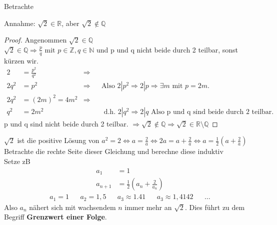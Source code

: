 \documentclass[a4paper,titlepage,oneside]{article}
\def\N{\ensuremath{\mathbb{N}} }
\def\Q{\ensuremath{\mathbb{Q}} }
\def\Z{\ensuremath{\mathbb{Z}} }
\def\R{\ensuremath{\mathbb{R}} }
\def\WSP{\text{Widerspruch! }}
\theoremstyle{thmstyle}
\begin{document}
\begin{subbsp}
Betrachte
\begin{center}  \end{center}
Annahme: \( \sqrt{2} \in \R\), aber \(\sqrt{2} \not\in \Q\)
\end{subbsp}
\begin{proof} Angenommen $\displaystyle \sqrt{2} \in \Q$ \\
$ \displaystyle \sqrt{2} \in \Q \Rightarrow \frac{p}{q} \text{ mit }p \in \Z, q \in \N $ und p und q nicht beide durch 2 teilbar, sonst kürzen wir.
\begin{align*}
2 &= \frac{p^2}{q^2} &\Rightarrow\\
2q^2 &= p^2 &\Rightarrow &&\text{Also } 2 | p^2 \Rightarrow 2 | p \Rightarrow \exists m \text{ mit } p = 2 m. \\
2q^2 &= (2m)^2 = 4m^2 &\Rightarrow \\
q^2 &= 2m^2 & &&\text{ d.h. } 2 | q^2 \Rightarrow 2 | q \text{ Also p und q sind beide durch 2 teilbar.}
\end{align*}
 \WSP p und q sind nicht beide durch 2 teilbar. $\displaystyle \Rightarrow \sqrt{2} \not\in \Q \Rightarrow \sqrt{2} \in \R\setminus\Q$
\end{proof}

\begin{subbem}
\( \sqrt{2} \) ist die positive Lösung von $ \displaystyle a^2 = 2 \Leftrightarrow a = \frac{2}{a} \Leftrightarrow  2a = a + \frac{2}{a} \Leftrightarrow a= \frac{1}{2}\left(a + \frac{2}{a}\right)$ \\
Betrachte die rechte Seite dieser Gleichung und berechne diese induktiv\\
Setze zB
\begin{align*}
a_1 &= 1\\
a_{n+1} &= \frac{1}{2}\left(a_n + \frac{2}{a_n}\right)
\end{align*}
\begin{align*}
a_1 = 1 && a_2 = 1,5 && a_3 \approx 1.41 && a_3 \approx 1,4142 &&\dots
\end{align*}
Also \(a_n\) nähert sich mit wachsendem \(n\) immer mehr an \(\sqrt{2}\). Dies führt zu dem Begriff \textbf{Grenzwert einer Folge}.
\end{subbem}
\end{document}
